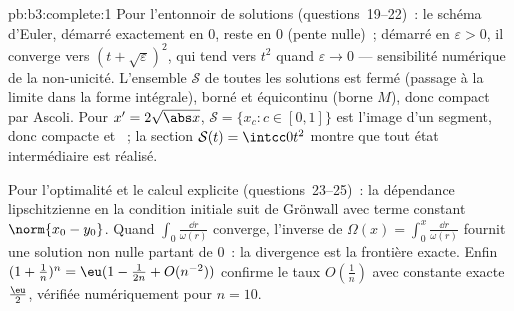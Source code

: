 \begin{solution}{pb:b3:complete:1}
Pour l'entonnoir de solutions (questions~19--22)~: le schéma
d'Euler, démarré exactement en $0$, reste en $0$ (pente
nulle)~; démarré en $\varepsilon > 0$, il converge vers $(t +
\sqrt\varepsilon)^2$, qui tend vers $t^2$ quand
$\varepsilon \to 0$ --- sensibilité numérique de la
non-unicité. L'ensemble $\mathcal S$ de toutes les solutions
est fermé (passage à la limite dans la forme intégrale),
borné et équicontinu (borne $M$), donc compact par Ascoli.
Pour $x' = 2\sqrt{\abs x}$, $\mathcal S = \{x_c : c \in
[0,1]\}$ est l'image  d'un segment, donc compacte et
~; la section $\mathcal S(t) = \intcc0{t^2}$ montre
que tout état intermédiaire est réalisé.

Pour l'optimalité et le calcul explicite (questions~23--25)~:
la dépendance lipschitzienne en la condition initiale suit
de Grönwall avec terme constant $\norm{x_0 - y_0}$. Quand
$\int_0\frac{\dd r}{\omega(r)}$ converge, l'inverse de
$\Omega(x) = \int_0^x\frac{\dd r}{\omega(r)}$ fournit une
solution non nulle partant de $0$~: la divergence est la
frontière exacte. Enfin $(1+\frac1n)^n =
\eu(1-\frac1{2n}+O(n^{-2}))$ confirme le taux $O(\frac1n)$
avec constante exacte $\frac\eu2$, vérifiée numériquement
pour $n = 10$.

\end{solution}
